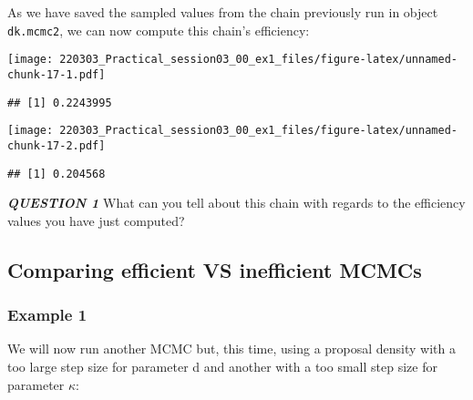 \documentclass[
]{article}
\newenvironment{Shaded}{\begin{snugshade}}{\end{snugshade}}
\newcommand{\AttributeTok}[1]{\textcolor[rgb]{0.77,0.63,0.00}{#1}}
\newcommand{\CommentTok}[1]{\textcolor[rgb]{0.56,0.35,0.01}{\textit{#1}}}
\newcommand{\FunctionTok}[1]{\textcolor[rgb]{0.00,0.00,0.00}{#1}}
\newcommand{\NormalTok}[1]{#1}
\newcommand{\SpecialCharTok}[1]{\textcolor[rgb]{0.00,0.00,0.00}{#1}}
\begin{document}
As we have saved the sampled values from the chain previously run in
object \texttt{dk.mcmc2}, we can now compute this chain's efficiency:

\begin{Shaded}
\end{Shaded}

\texttt{[image: 220303\_Practical\_session03\_00\_ex1\_files/figure-latex/unnamed-chunk-17-1.pdf]}

\begin{verbatim}
## [1] 0.2243995
\end{verbatim}

\begin{Shaded}
\end{Shaded}

\texttt{[image: 220303\_Practical\_session03\_00\_ex1\_files/figure-latex/unnamed-chunk-17-2.pdf]}

\begin{verbatim}
## [1] 0.204568
\end{verbatim}

\emph{\textbf{QUESTION 1}} What can you tell about this chain with
regards to the efficiency values you have just computed?

\hypertarget{comparing-efficient-vs-inefficient-mcmcs}{%
\subsection{Comparing efficient VS inefficient
MCMCs}\label{comparing-efficient-vs-inefficient-mcmcs}}

\hypertarget{example-1}{%
\subsubsection{Example 1}\label{example-1}}

We will now run another MCMC but, this time, using a proposal density
with a too large step size for parameter d and another with a too small
step size for parameter \(\kappa\):
\end{document}
